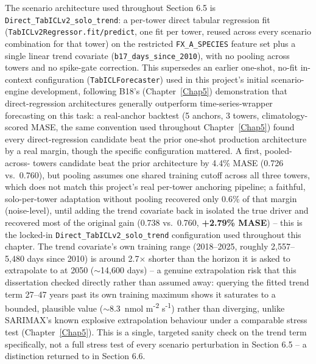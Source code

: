 The scenario architecture used throughout Section 6.5 is \texttt{Direct\_TabICLv2\_solo\_trend}: a
per-tower direct tabular regression fit (\texttt{TabICLv2Regressor.fit/predict}, one fit per tower,
reused across every scenario combination for that tower) on the restricted \texttt{FX\_A\_SPECIES}
feature set plus a single linear trend covariate (\texttt{b17\_days\_since\_2010}), with no pooling
across towers and no spike-gate correction. This supersedes an earlier one-shot, no-fit
in-context configuration (\texttt{TabICLForecaster}) used in this project's initial scenario-engine
development, following B18's (Chapter~\ref{Chap5}) demonstration that direct-regression
architectures generally outperform time-series-wrapper forecasting on this task: a real-anchor
backtest (5 anchors, 3 towers, climatology-scored MASE, the same convention used throughout
Chapter~\ref{Chap5}) found every direct-regression candidate beat the prior one-shot production
architecture by a real margin, though the specific configuration mattered. A first, pooled-across-
towers candidate beat the prior architecture by 4.4\% MASE (0.726 vs.\ 0.760), but pooling assumes
one shared training cutoff across all three towers, which does not match this project's real
per-tower anchoring pipeline; a faithful, solo-per-tower adaptation without pooling recovered only
0.6\% of that margin (noise-level), until adding the trend covariate back in isolated the true
driver and recovered most of the original gain (0.738 vs.\ 0.760, \textbf{+2.79\% MASE}) -- this is
the locked-in \texttt{Direct\_TabICLv2\_solo\_trend} configuration used throughout this chapter.
The trend covariate's own training range (2018--2025, roughly 2{,}557--5{,}480 days since 2010) is
around 2.7$\times$ shorter than the horizon it is asked to extrapolate to at 2050 ($\sim$14{,}600
days) -- a genuine extrapolation risk that this dissertation checked directly rather than assumed
away: querying the fitted trend term 27--47 years past its own training maximum shows it saturates
to a bounded, plausible value ($\sim$8.3~nmol m\textsuperscript{-2} s\textsuperscript{-1}) rather
than diverging, unlike SARIMAX's known explosive extrapolation behaviour under a comparable stress
test (Chapter~\ref{Chap5}). This is a single, targeted sanity check on the trend term specifically,
not a full stress test of every scenario perturbation in Section 6.5 -- a distinction returned to in
Section 6.6.


